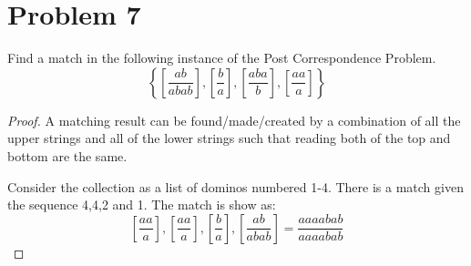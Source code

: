 \documentclass[11pt]{article}
\begin{document}
\newpage
\section*{Problem 7}

Find a match in the following instance of the Post Correspondence Problem.
$$  \left\{
	\left[ \dfrac{ab}{abab} \right], 
	\left[ \dfrac{b}{a} \right], 
	\left[ \dfrac{aba}{b} \right],
	\left[ \dfrac{aa}{a} \right] \right\} $$

\begin{proof}
A matching result can be found/made/created by a combination of all the upper strings and all of the lower strings such that reading both of the top and bottom are the same. 

\noindent
Consider the collection as a list of dominos numbered 1-4. There is a match given the sequence 4,4,2 and 1. The match is show as:
$$ \left[ \dfrac{aa}{a} \right] , \left[ \dfrac{aa}{a} \right] , \left[ \dfrac{b}{a} \right] , \left[ \dfrac{ab}{abab} \right] = \dfrac{aaaabab}{aaaabab}$$
\end{proof}
\end{document}
